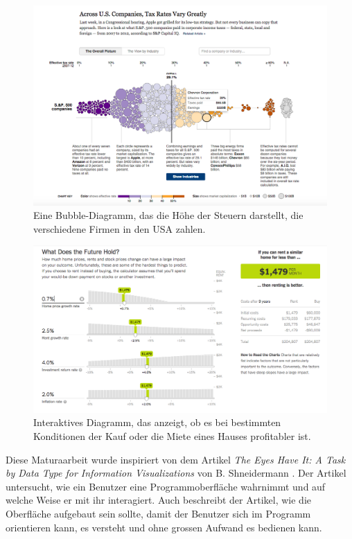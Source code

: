 \begin{figure}[htbp]
	\centering
	\includegraphics[width=1\linewidth]{images/nytimes-taxes}
	\caption[Bubble-Diagramm in der New York Times]{Eine Bubble-Diagramm, das die Höhe der Steuern darstellt, die verschiedene Firmen in den USA zahlen. \cite{nytimes-taxes}}
	\label{fig:nytimes-taxes}
\end{figure}

\begin{figure}[htbp]
	\centering
	\includegraphics[width=1\linewidth]{images/nytimes-realestate}
	\caption[Interaktives Diagramm in der New York Times]{Interaktives Diagramm, das anzeigt, ob es bei bestimmten Konditionen der Kauf oder die Miete eines Hauses profitabler ist. \cite{nytimes-realestate}}
	\label{fig:nytimes-realestate}
\end{figure}

Diese Maturaarbeit wurde inspiriert von dem Artikel \textit{The Eyes Have It: A Task by Data Type for Information Visualizations} von B. Shneidermann \cite{shneiderman}. Der Artikel untersucht, wie ein Benutzer eine Programmoberfläche wahrnimmt und auf welche Weise er mit ihr interagiert. Auch beschreibt der Artikel, wie die Oberfläche aufgebaut sein sollte, damit der Benutzer sich im Programm orientieren kann, es versteht und ohne grossen Aufwand es bedienen kann. 

